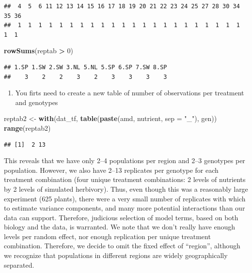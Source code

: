 \documentclass[
  12pt,
]{book}
\newenvironment{Shaded}{\begin{snugshade}}{\end{snugshade}}
\newcommand{\DataTypeTok}[1]{\textcolor[rgb]{0.13,0.29,0.53}{#1}}
\newcommand{\DecValTok}[1]{\textcolor[rgb]{0.00,0.00,0.81}{#1}}
\newcommand{\KeywordTok}[1]{\textcolor[rgb]{0.13,0.29,0.53}{\textbf{#1}}}
\newcommand{\NormalTok}[1]{#1}
\newcommand{\OperatorTok}[1]{\textcolor[rgb]{0.81,0.36,0.00}{\textbf{#1}}}
\newcommand{\StringTok}[1]{\textcolor[rgb]{0.31,0.60,0.02}{#1}}
\providecommand{\tightlist}{%
  \setlength{\itemsep}{0pt}\setlength{\parskip}{0pt}}
\begin{document}
\begin{verbatim}
##  4  5  6 11 12 13 14 15 16 17 18 19 20 21 22 23 24 25 27 28 30 34 35 36 
##  1  1  1  1  1  1  1  1  1  1  1  1  1  1  1  1  1  1  1  1  1  1  1  1
\end{verbatim}

\begin{Shaded}
\begin{Highlighting}[]
\KeywordTok{rowSums}\NormalTok{(reptab }\OperatorTok{>}\StringTok{ }\DecValTok{0}\NormalTok{)}
\end{Highlighting}
\end{Shaded}

\begin{verbatim}
## 1.SP 1.SW 2.SW 3.NL 5.NL 5.SP 6.SP 7.SW 8.SP 
##    3    2    2    3    2    3    3    3    3
\end{verbatim}

\begin{enumerate}
\def\labelenumi{\arabic{enumi}.}
\setcounter{enumi}{2}
\tightlist
\item
  You firts need to create a new table of number of observations per treatment and genotypes
\end{enumerate}

\begin{Shaded}
\begin{Highlighting}[]
\NormalTok{reptab2 <-}\StringTok{ }\KeywordTok{with}\NormalTok{(dat_tf, }\KeywordTok{table}\NormalTok{(}\KeywordTok{paste}\NormalTok{(amd, nutrient, }\DataTypeTok{sep =} \StringTok{"_"}\NormalTok{), gen))}
\KeywordTok{range}\NormalTok{(reptab2)}
\end{Highlighting}
\end{Shaded}

\begin{verbatim}
## [1]  2 13
\end{verbatim}

This reveals that we have only 2--4 populations per region and 2--3 genotypes per population. However, we also have 2--13 replicates per genotype for each treatment combination (four unique treatment combinations: 2 levels of nutrients by 2 levels of simulated herbivory). Thus, even though this was a reasonably large experiment (625 plants), there were a very small number of replicates with which to estimate variance components, and many more potential interactions than our data can support. Therefore, judicious selection of model terms, based on both biology and the data, is warranted. We note that we don't really have enough levels per random effect, nor enough replication per unique treatment combination. Therefore, we decide to omit the fixed effect of ``region'', although we recognize that populations in different regions are widely geographically separated.
\end{document}
